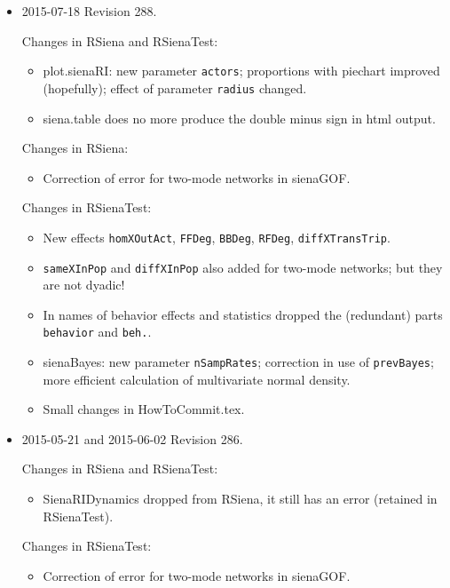 \documentclass[a4paper,fleqn,11pt]{article}
\newcommand{\+}{\, + \,}
\newcommand{\sfn}[1]{\textsf{#1}}
\newcommand{\rs}{{\sf RSiena}}
\newcommand{\rst}{{\sf RSienaTest}}
\begin{document}
\begin{small}
\begin{itemize}
\item 2015-07-18 Revision 288.

Changes in \textsf{RSiena} and \textsf{RSienaTest}:
\begin{itemize}
   \item \sfn{plot.sienaRI}: new parameter \texttt{actors}; proportions with
     piechart improved (hopefully); effect of parameter \texttt{radius} changed.
   \item \textsf{siena.table} does no more produce the double minus sign in html output.
\end{itemize}

Changes in RSiena:
\begin{itemize}
\item Correction of error for two-mode networks in \sfn{sienaGOF}.
\end{itemize}

Changes in \textsf{RSienaTest}:
\begin{itemize}
\item New effects \texttt{homXOutAct}, \texttt{FFDeg}, \texttt{BBDeg},
   \texttt{RFDeg}, \texttt{diffXTransTrip}.
   \item \texttt{sameXInPop} and \texttt{diffXInPop} also added for two-mode networks;
     but they are not dyadic!
   \item In names of behavior effects and statistics dropped the
     (redundant) parts \texttt{behavior} and \texttt{beh.}.
   \item \textsf{sienaBayes}: new parameter \texttt{nSampRates};
     correction in use of \texttt{prevBayes};
	 more efficient calculation of multivariate normal density.
   \item Small changes in \sfn{HowToCommit.tex}.
\end{itemize}

\item 2015-05-21 and 2015-06-02 Revision 286.

Changes in \textsf{RSiena} and \textsf{RSienaTest}:
\begin{itemize}
\item \sfn{SienaRIDynamics} dropped from \rs, it still has an error
      (retained in \rst).
\end{itemize}

Changes in \textsf{RSienaTest}:
\begin{itemize}
\item Correction of error for two-mode networks in \sfn{sienaGOF}.
\end{itemize}


\end{itemize}
\end{small}
\end{document}
